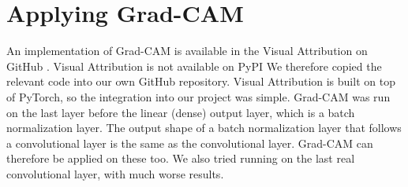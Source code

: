 \section{Applying Grad-CAM}

An implementation of Grad-CAM is available in the Visual Attribution on GitHub \cite{visualattribution}. Visual Attribution is not available on PyPI We therefore copied the relevant code into our own GitHub repository. Visual Attribution is built on top of PyTorch, so the integration into our project was simple. Grad-CAM was run on the last layer before the linear (dense) output layer, which is a batch normalization layer. The output shape of a batch normalization layer that follows a convolutional layer is the same as the convolutional layer. Grad-CAM can therefore be applied on these too. We also tried running on the last real convolutional layer, with much worse results.

